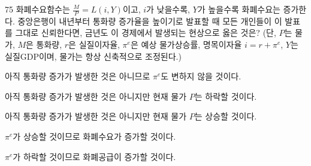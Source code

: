 \begin{question}{75}
화폐수요함수는 $\frac{ M } { P } =L(i, Y)$이고, $i$가 낮을수록, $Y$가 높을수록 화폐수요는 증가한다. 중앙은행이 내년부터 통화량 증가율을 높이기로 발표할 때 모든 개인들이 이 발표를 그대로 신뢰한다면, 금년도 이 경제에서 발생되는 현상으로 옳은 것은? (단, $P$는 물가, $M$은 통화량, $r$은 실질이자율, $\pi^{ e }$은 예상 물가상승률, 명목이자율 $i=r+ \pi^{ e }$, $Y$는 실질GDP이며, 물가는 항상 신축적으로 조정된다.)
\begin{choices}
  \item 아직 통화량 증가가 발생한 것은 아니므로 $\pi^{ e }$도 변하지 않을 것이다.
  \item 아직 통화량 증가가 발생한 것은 아니지만 현재 물가 $P$는 하락할 것이다.
  \item 아직 통화량 증가가 발생한 것은 아니지만 현재 물가 $P$는 상승할 것이다.
  \item $\pi^{ e }$가 상승할 것이므로 화폐수요가 증가할 것이다.
  \item $\pi^{ e }$가 하락할 것이므로 화폐공급이 증가할 것이다.
\end{choices}
\end{question}
